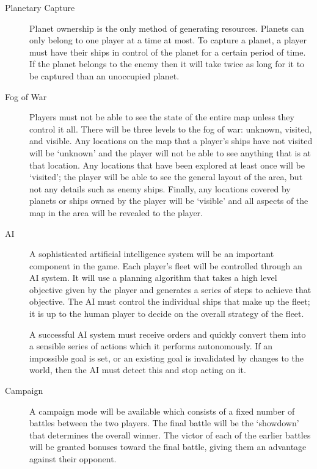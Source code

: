 \begin{description}
	\item[Planetary Capture]

	Planet ownership is the only method of generating resources. Planets can only belong to
	one player at a time at most. To capture a planet, a player must have their ships in control
	of the planet for a certain period of time. If the planet belongs to the enemy then it will
	take twice as long for it to be captured than an unoccupied planet.


	\item[Fog of War]

	Players must not be able to see the state of the entire map unless they control it all. There
	will be three levels to the fog of war: unknown, visited, and visible. Any locations on the map
	that a player's ships have not visited will be `unknown' and the player will not be able to see
	anything that is at that location. Any locations that have been explored at least once will be
	`visited'; the player will be able to see the general layout of the area, but not any details
	such as enemy ships. Finally, any locations covered by planets or ships owned by the player will
	be `visible' and all aspects of the map in the area will be revealed to the player.

	\item[AI]

	A sophisticated artificial intelligence system will be an important component in the game.
	Each player's fleet will be controlled through an AI system. It will use a planning algorithm
	that takes a high level objective given by the player and generates a series of steps to
	achieve that objective. The AI must control the individual ships that make up the fleet; it
	is up to the human player to decide on the overall strategy of the fleet.

	A successful AI system must receive orders and quickly convert them into a sensible series of
	actions which it performs autonomously. If an impossible goal is set, or an existing goal is
	invalidated by changes to the world, then the AI must detect this and stop acting on it.


	\item[Campaign]

	A campaign mode will be available which consists of a fixed number of battles between the two players.
	The final battle will be the `showdown' that determines the overall winner. The victor of each of
	the earlier battles will be granted bonuses toward the final battle, giving them an advantage against
	their opponent.


\end{description}
